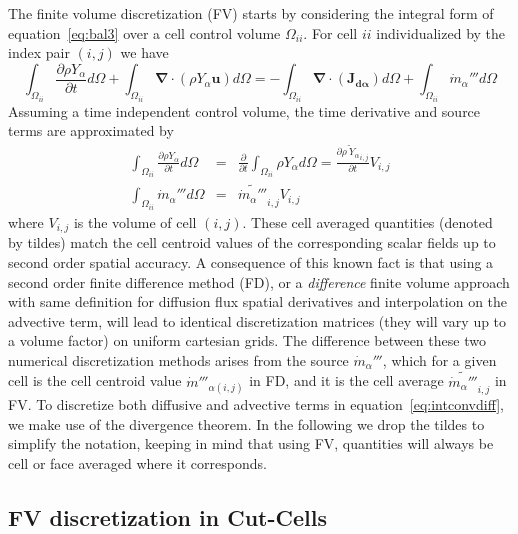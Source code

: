 The finite volume discretization (FV) starts by considering the integral form of equation~\eqref{eq:bal3} over a cell control volume $\Omega_{ii}$. For
cell $ii$ individualized by the index pair $(i,j)$ we have
%
\begin{equation}
 \int_{\Omega_{ii}} {\frac{\partial \rho Y_\alpha}{\partial t}} d \Omega + \int_{\Omega_{ii}} { \boldsymbol{\nabla} \cdot  \left(  \rho Y_\alpha \mathbf{u} \right)
      } d \Omega  = -\int_{\Omega_{ii}} { \boldsymbol{\nabla} \cdot \left(  \mathbf{J_{d \alpha}}  \right)  } d \Omega + \int_{\Omega_{ii}} { \dot{m}_\alpha''' } d \Omega \label{eq:intconvdiff}
\end{equation}
%
Assuming a time independent control volume, the time derivative and source terms are approximated by
%
\begin{eqnarray}
  \int_{\Omega_{ii}} {\frac{\partial \rho Y_\alpha}{\partial t}} d \Omega & = & \frac{\partial}{\partial t} \int_{\Omega_{ii}} {\rho Y_\alpha} d \Omega
  = \frac{\partial \widetilde{\rho \: Y_\alpha }_{i,j}}{\partial t} V_{i,j} \\
  \int_{\Omega_{ii}} { \dot{m}_\alpha''' } d \Omega & = & \widetilde{ \dot{m}_\alpha''' }_{i,j} V_{i,j} \label{eq:intcons}
\end{eqnarray}
%
where $V_{i,j}$ is the volume of cell $(i,j)$. These cell averaged quantities (denoted by tildes) match the cell centroid values of the corresponding scalar fields up to second order spatial accuracy. A consequence of this known fact is that using a second order finite difference method (FD), or a \textit{difference} finite volume approach with same definition
 for diffusion flux spatial derivatives and interpolation on the advective term, will lead to identical discretization matrices (they will vary up to a volume factor) on uniform cartesian grids. The difference between these two numerical discretization methods arises from the source $\dot{m}_\alpha''' $, which for a given cell is the cell centroid value $\dot{m}'''_{\alpha (i,j)}$ in FD, and it is the cell average $ \widetilde{ \dot{m}_\alpha''' }_{i,j}$ in FV. To discretize both diffusive and advective terms in equation~\eqref{eq:intconvdiff}, we make use of the divergence theorem. In the following we drop the tildes to simplify the notation, keeping in mind that using FV, quantities will always be cell or face averaged where it corresponds.


\subsection{FV discretization in Cut-Cells} \label{sec:cc}

